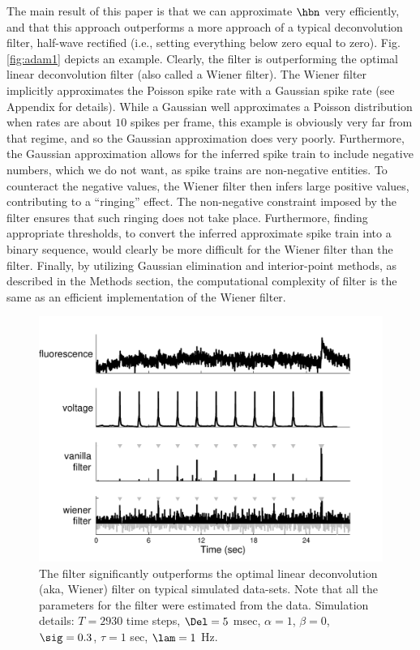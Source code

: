 The main result of this paper is that we can approximate $\hbn$ very efficiently, and that this approach outperforms a more \naive approach of a typical deconvolution filter, half-wave rectified (i.e., setting everything below zero equal to zero).  Fig. \ref{fig:adam1} depicts an example. Clearly, the \foopsi filter is outperforming the optimal linear deconvolution filter (also called a Wiener filter).  The Wiener filter implicitly approximates the Poisson spike rate with a Gaussian spike rate (see Appendix for details). While a Gaussian well approximates a Poisson distribution when rates are about $10$ spikes per frame, this example is obviously very far from that regime, and so the Gaussian approximation does very poorly. Furthermore, the Gaussian approximation allows for the inferred spike train to include negative numbers, which we do not want, as spike trains are non-negative entities.  To counteract the negative values, the Wiener filter then infers large positive values, contributing to a ``ringing'' effect.  The non-negative constraint imposed by the \foopsi filter ensures that such ringing does not take place.  Furthermore, finding appropriate thresholds, to convert the inferred approximate spike train into a binary sequence, would clearly be more difficult for the Wiener filter than the \foopsi filter. Finally, by utilizing Gaussian elimination and interior-point methods, as described in the Methods section, the computational complexity of \foopsi filter is the same as an efficient implementation of the Wiener filter.  

\begin{figure}[h!]
\centering \includegraphics[width=.9\linewidth]{../figs/adam1}
\caption{The \foopsi filter significantly outperforms the optimal linear deconvolution (aka, Wiener) filter on typical simulated data-sets.  Note that all the parameters for the \foopsi filter were estimated from the data.  Simulation details: $T=2930$ time steps, $\Del=5$ msec, $\alpha=1$, $\beta=0$, $\sig=0.3$, $\tau=1$ sec, $\lam=1$ Hz.} \label{fig:woopsi}
\end{figure}

